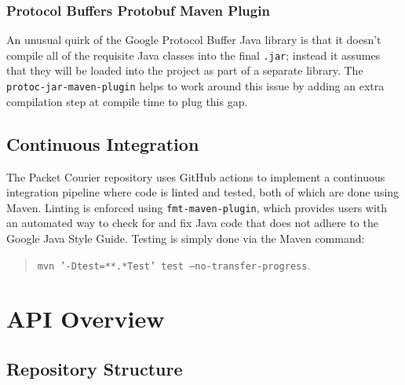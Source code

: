 \subsubsection{Protocol Buffers Protobuf Maven Plugin}

An unusual quirk of the Google Protocol Buffer Java library is that it doesn't compile all of the requisite Java
classes into the final \texttt{.jar}; instead it assumes that they will be loaded into the project as part of a
separate library. The \texttt{protoc-jar-maven-plugin}\cite{protoc_jar_maven_plugin} helps to work around this issue
by adding an extra compilation step at compile time to plug this gap.

\subsection{Continuous Integration}

The Packet Courier repository uses GitHub actions\cite{github_actions} to implement a continuous integration
pipeline\cite{aws_ci} where code is linted and tested, both of which are done using Maven. Linting is enforced using
\texttt{fmt-maven-plugin}\cite{fmt_maven_plugin}, which provides users with an automated way to check for and fix Java
code that does not adhere to the Google Java Style Guide\cite{google_java_format, google_java_style_guide}. Testing
is simply done via the Maven command:
\begin{quote}
    \texttt{mvn '-Dtest=**.*Test' test --no-transfer-progress}.
\end{quote}


\newpage


\section{API Overview}

\subsection{Repository Structure}


